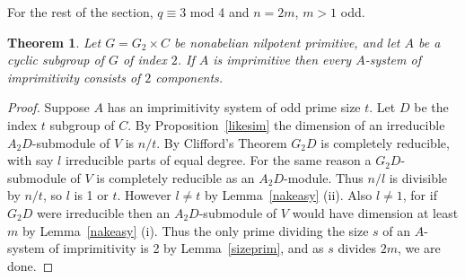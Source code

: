 \documentclass[12pt]{amsart}
\newtheorem{theorem}{Theorem}[section]
\theoremstyle{definition}
\theoremstyle{remark}
\begin{document}
 For the rest of the section, $q\equiv 3$ mod 4
 and $n=2m$, $m>1$ odd.   
\begin{theorem}
\label{evenimprim}
 Let $G= G_2 \times C$ be nonabelian nilpotent primitive, 
 and let $A$ be a cyclic subgroup of $G$ of index $2$.
 If $A$ is imprimitive then every $A$-system of  
 imprimitivity consists of $2$ components. 
\end{theorem}
\begin{proof}
 Suppose $A$ has an imprimitivity system of odd prime
 size $t$. Let $D$ be the index $t$ subgroup of $C$.
 By Proposition~\ref{likesim} the dimension of an 
 irreducible $A_2D$-submodule of $V$ is  
 $n/t$. By Clifford's Theorem $G_2D$ is completely 
 reducible, with say $l$ irreducible parts of equal degree. 
 For the same reason a $G_2D$-submodule of $V$ 
 is completely reducible as an $A_2D$-module.
 Thus $n/l$ is divisible by $n/t$, so $l$ is 1 or $t$. 
 However $l\neq t$ by 
 Lemma~\ref{nakeasy} (ii). 
 Also $l \neq 1$, for if $G_2D$ were irreducible then 
 an $A_2D$-submodule of $V$ would have dimension at
 least $m$ by Lemma~\ref{nakeasy} (i).
 Thus the only prime dividing the size $s$ of an
 $A$-system of imprimitivity is 2 by Lemma~\ref{sizeprim},
 and as $s$ divides $2m$, we are done.
\end{proof}
\end{document}
